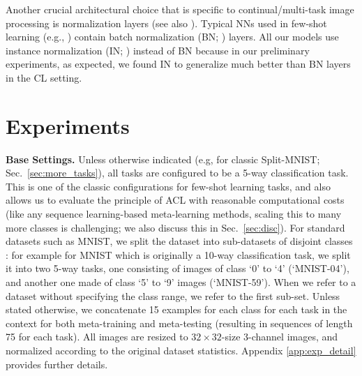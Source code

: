 \documentclass{article}
\begin{document}
Another crucial architectural choice that is specific to continual/multi-task image processing is normalization layers (see also \citet{Bronskill0RNT20}).
Typical NNs used in few-shot learning (e.g., \citet{VinyalsBLKW16}) contain batch normalization (BN; \citet{IoffeS15}) layers.
All our models use instance normalization (IN; \citet{ulyanov2016instance}) instead of BN because
in our preliminary experiments, as expected, we found IN to generalize much better than BN layers in the CL setting.


\section{Experiments}
\label{sec:exp}

\textbf{Base Settings.}
Unless otherwise indicated (e.g, for classic Split-MNIST; Sec.~\ref{sec:more_tasks}), all tasks are configured to be a 5-way classification task.
This is one of the classic configurations for few-shot learning tasks, and also allows us to evaluate the principle of ACL with reasonable computational costs (like any sequence learning-based meta-learning methods, scaling this to many more classes is challenging; we also discuss this in Sec.~\ref{sec:disc}).
For standard datasets such as MNIST, we split the dataset into sub-datasets of disjoint classes \citep{SrivastavaMKGS13}: for example for MNIST which is originally a 10-way classification task, we split it into two 5-way tasks, one consisting of images of class `0' to `4' (`MNIST-04'), and another one made of class `5' to `9' images (`MNIST-59').
When we refer to a dataset without specifying the class range, we refer to the first sub-set.
Unless stated otherwise, we concatenate 15 examples for each class for each task in the context for both meta-training and meta-testing (resulting in sequences of length 75 for each task).
All images are resized to $32\times32$-size $3$-channel images, and normalized according to the original dataset statistics. Appendix \ref{app:exp_detail} provides further details. 
\end{document}
